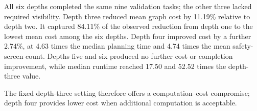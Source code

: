 All six depths completed the same nine validation tasks; the other three lacked required visibility. Depth three reduced mean graph cost by 11.19\% relative to depth two. It captured 84.11\% of the observed reduction from depth one to the lowest mean cost among the six depths. Depth four improved cost by a further 2.74\%, at 4.63 times the median planning time and 4.74 times the mean safety-screen count. Depths five and six produced no further cost or completion improvement, while median runtime reached 17.50 and 52.52 times the depth-three value.

The fixed depth-three setting therefore offers a computation--cost compromise; depth four provides lower cost when additional computation is acceptable.
